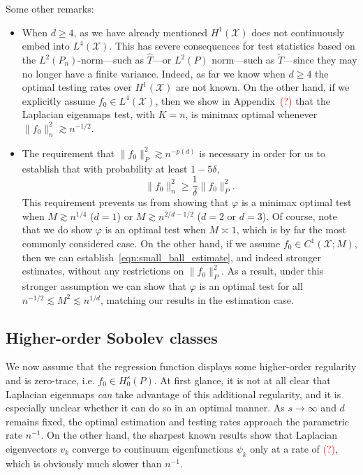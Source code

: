 \documentclass{article}
\newcommand{\1}{\mathbf{1}}
\newcommand{\Leb}{L}
\newcommand{\mc}[1]{\mathcal{#1}}
\newcommand{\wt}[1]{\widetilde{#1}}
\newcommand{\wh}[1]{\widehat{#1}}
\theoremstyle{alden}
\theoremstyle{aldenthm}
\theoremstyle{definition}
\theoremstyle{remark}
\begin{document}
Some other remarks:
\begin{itemize}
	\item When $d \geq 4$, as we have already mentioned $H^1(\mc{X})$ does not continuously embed into $\Leb^4(\mc{X})$. This has severe consequences for test statistics based on the $L^2(P_n)$-norm---such as $\wh{T}$---or $L^2(P)$ norm---such as $\wt{T}$---since they may no longer have a finite variance. Indeed, as far we know when $d \geq 4$ the optimal testing rates over $H^1(\mc{X})$ are not known. On the other hand, if we explicitly assume $f_0 \in \Leb^4(\mc{X})$, then we show in Appendix~\textcolor{red}{(?)} that the Laplacian eigenmaps test, with $K = n$, is minimax optimal whenever $\|f_0\|_n^2 \gtrsim n^{-1/2}$. 
	\item The requirement that $\|f_0\|_P^2 \gtrsim n^{-p(d)}$ is necessary in order for us to establish that with probability at least $1 - 5\delta$,
	\begin{equation}
	\label{eqn:small_ball_estimate}
	\|f_0\|_n^2 \geq \frac{1}{\delta}\|f_0\|_P^2.
	\end{equation}
	This requirement prevents us from showing that $\varphi$ is a minimax optimal test when $M \gtrsim n^{1/4}$ ($d = 1$) or $M \gtrsim n^{2/d - 1/2}$ ($d = 2$ or $d = 3$). Of course, note that we do show $\varphi$ is an optimal test when $M \asymp 1$, which is by far the most commonly considered case. On the other hand, if we assume $f_0 \in C^1(\mc{X};M)$, then we can establish~\eqref{eqn:small_ball_estimate}, and indeed stronger estimates, without any restrictions on $\|f_0\|_P^2$. As a result, under this stronger assumption we can show that $\varphi$ is an optimal test for all $n^{-1/2} \lesssim M^2 \lesssim n^{1/d}$, matching our results in the estimation case.
\end{itemize}

\subsection{Higher-order Sobolev classes}
\label{sec:higher_order_sobolev_classes}
We now assume that the regression function displays some higher-order regularity and is zero-trace, i.e. $f_0 \in H_0^s(P)$. At first glance, it is not at all clear that Laplacian eigenmaps \emph{can} take advantage of this additional regularity, and it is especially unclear whether it can do so in an optimal manner. As $s \to \infty$ and $d$ remains fixed, the optimal estimation and testing rates approach the parametric rate $n^{-1}$. On the other hand, the sharpest known results show that Laplacian eigenvectors $v_k$ converge to continuum eigenfunctions $\psi_k$ only at a rate of \textcolor{red}{(?)}, which is obviously much slower than $n^{-1}$. 
\end{document}
